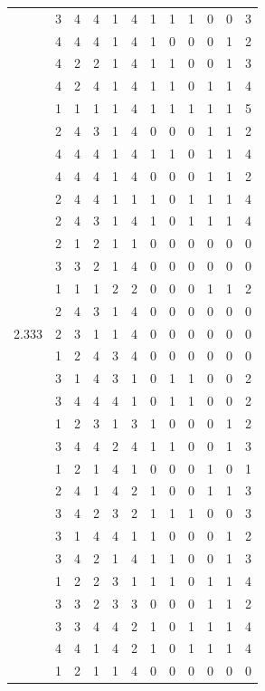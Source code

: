 \documentclass[]{book}
\theoremstyle{definition}
\theoremstyle{definition}
\theoremstyle{definition}
\theoremstyle{remark}
\begin{document}
\begin{table}
{\begin{tabular}[t]{rrrrrrrrrrrr}
 & 3 & 4 & 4 & 1 & 4 & 1 & 1 & 1 & 0 & 0 & 3\\
 & 4 & 4 & 4 & 1 & 4 & 1 & 0 & 0 & 0 & 1 & 2\\
 & 4 & 2 & 2 & 1 & 4 & 1 & 1 & 0 & 0 & 1 & 3\\
 & 4 & 2 & 4 & 1 & 4 & 1 & 1 & 0 & 1 & 1 & 4\\
 & 1 & 1 & 1 & 1 & 4 & 1 & 1 & 1 & 1 & 1 & 5\\
 & 2 & 4 & 3 & 1 & 4 & 0 & 0 & 0 & 1 & 1 & 2\\
 & 4 & 4 & 4 & 1 & 4 & 1 & 1 & 0 & 1 & 1 & 4\\
 & 4 & 4 & 4 & 1 & 4 & 0 & 0 & 0 & 1 & 1 & 2\\
 & 2 & 4 & 4 & 1 & 1 & 1 & 0 & 1 & 1 & 1 & 4\\
 & 2 & 4 & 3 & 1 & 4 & 1 & 0 & 1 & 1 & 1 & 4\\
 & 2 & 1 & 2 & 1 & 1 & 0 & 0 & 0 & 0 & 0 & 0\\
 & 3 & 3 & 2 & 1 & 4 & 0 & 0 & 0 & 0 & 0 & 0\\
 & 1 & 1 & 1 & 2 & 2 & 0 & 0 & 0 & 1 & 1 & 2\\
 & 2 & 4 & 3 & 1 & 4 & 0 & 0 & 0 & 0 & 0 & 0\\
2.333 & 2 & 3 & 1 & 1 & 4 & 0 & 0 & 0 & 0 & 0 & 0\\
 & 1 & 2 & 4 & 3 & 4 & 0 & 0 & 0 & 0 & 0 & 0\\
 & 3 & 1 & 4 & 3 & 1 & 0 & 1 & 1 & 0 & 0 & 2\\
 & 3 & 4 & 4 & 4 & 1 & 0 & 1 & 1 & 0 & 0 & 2\\
 & 1 & 2 & 3 & 1 & 3 & 1 & 0 & 0 & 0 & 1 & 2\\
 & 3 & 4 & 4 & 2 & 4 & 1 & 1 & 0 & 0 & 1 & 3\\
 & 1 & 2 & 1 & 4 & 1 & 0 & 0 & 0 & 1 & 0 & 1\\
 & 2 & 4 & 1 & 4 & 2 & 1 & 0 & 0 & 1 & 1 & 3\\
 & 3 & 4 & 2 & 3 & 2 & 1 & 1 & 1 & 0 & 0 & 3\\
 & 3 & 1 & 4 & 4 & 1 & 1 & 0 & 0 & 0 & 1 & 2\\
 & 3 & 4 & 2 & 1 & 4 & 1 & 1 & 0 & 0 & 1 & 3\\
 & 1 & 2 & 2 & 3 & 1 & 1 & 1 & 0 & 1 & 1 & 4\\
 & 3 & 3 & 2 & 3 & 3 & 0 & 0 & 0 & 1 & 1 & 2\\
 & 3 & 3 & 4 & 4 & 2 & 1 & 0 & 1 & 1 & 1 & 4\\
 & 4 & 4 & 1 & 4 & 2 & 1 & 0 & 1 & 1 & 1 & 4\\
 & 1 & 2 & 1 & 1 & 4 & 0 & 0 & 0 & 0 & 0 & 0\\

\end{tabular}}
\end{table}
\end{document}
